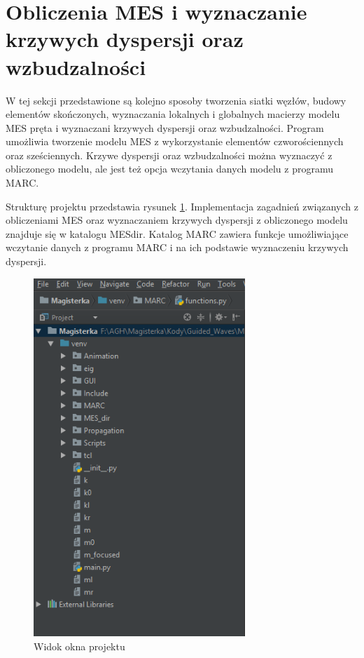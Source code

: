 \section{Obliczenia MES i wyznaczanie krzywych dyspersji oraz wzbudzalności}
\label{cha:obliczenia_mes}

W tej sekcji przedstawione są kolejno sposoby tworzenia siatki węzłów, budowy elementów skończonych, wyznaczania lokalnych i globalnych macierzy modelu MES pręta i wyznaczani krzywych dyspersji oraz wzbudzalności. Program umożliwia tworzenie modelu MES z wykorzystanie elementów czworościennych oraz sześciennych. Krzywe dyspersji oraz wzbudzalności można wyznaczyć z obliczonego modelu, ale jest też opcja wczytania danych modelu z programu MARC.

Strukturę projektu przedstawia rysunek \ref{fig:okno_projektu}. Implementacja zagadnień związanych z obliczeniami MES oraz wyznaczaniem krzywych dyspersji z obliczonego modelu znajduje się w katalogu MES\textunderscore dir. Katalog MARC zawiera funkcje umożliwiające wczytanie danych z programu MARC i na ich podstawie wyznaczeniu krzywych dyspersji.

\begin{figure}[h]
\centering
\includegraphics[width=8cm]{Zdjecia/5/okno_projektu}
\caption{Widok okna projektu}
\label{fig:okno_projektu}
\end{figure}











